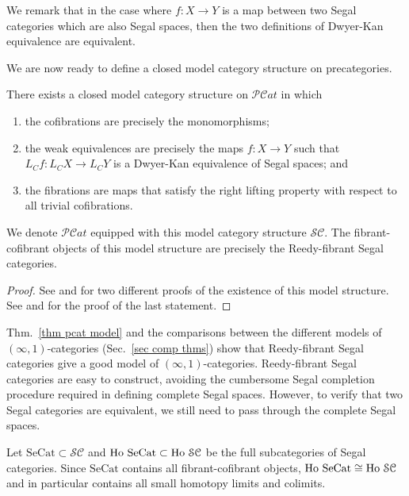 \begin{refsection}
We remark that in the case where $f:X\to Y$ is a map between two Segal categories which are also Segal spaces, then the two definitions of Dwyer-Kan equivalence are equivalent.

We are now ready to define a closed model category structure on precategories.

\begin{thm}\label{thm pcat model}
There exists a closed model category structure on $\mathcal{PC}at$ in which
\begin{enumerate}
\item the cofibrations are precisely the monomorphisms;
\item the weak equivalences are precisely the maps $f:X\to Y$ such that $L_Cf:L_CX\to L_CY$ is a Dwyer-Kan equivalence of Segal spaces; and
\item the fibrations are maps that satisfy the right lifting property with respect to all trivial cofibrations.
\end{enumerate}
We denote $\mathcal{PC}at$ equipped with this model category structure $\mathcal{SC}$. The fibrant-cofibrant objects of this model structure are precisely the Reedy-fibrant Segal categories.
\end{thm}
\begin{proof}
See \cite[Thm 2.3]{hs} and \cite[Thm 5.1]{bergner2} for two different proofs of the existence of this model structure. See \cite[Cor 5.13]{bergner2} and \cite[Thm 3.2]{bergner3} for the proof of the last statement.
\end{proof}

\begin{rmk}
Thm.~\ref{thm pcat model} and the comparisons between the different models of $(\infty,1)$-categories (Sec.~\ref{sec comp thms}) show that Reedy-fibrant Segal categories give a good model of $(\infty,1)$-categories. Reedy-fibrant Segal categories are easy to construct, avoiding the cumbersome Segal completion procedure required in defining complete Segal spaces. However, to verify that two Segal categories are equivalent, we still need to pass through the complete Segal spaces.
\end{rmk}

Let $\mathrm{SeCat}\subset\mathcal{SC}$ and $\operatorname{\mathrm{Ho} \,}\mathrm{SeCat}\subset\operatorname{\mathrm{Ho} \,}\mathcal{SC}$ be the full subcategories of Segal categories. Since $\mathrm{SeCat}$ contains all fibrant-cofibrant objects, $\operatorname{\mathrm{Ho} \,}\mathrm{SeCat}\cong\operatorname{\mathrm{Ho} \,}\mathcal{SC}$ and in particular contains all small homotopy limits and colimits.


\end{refsection}
